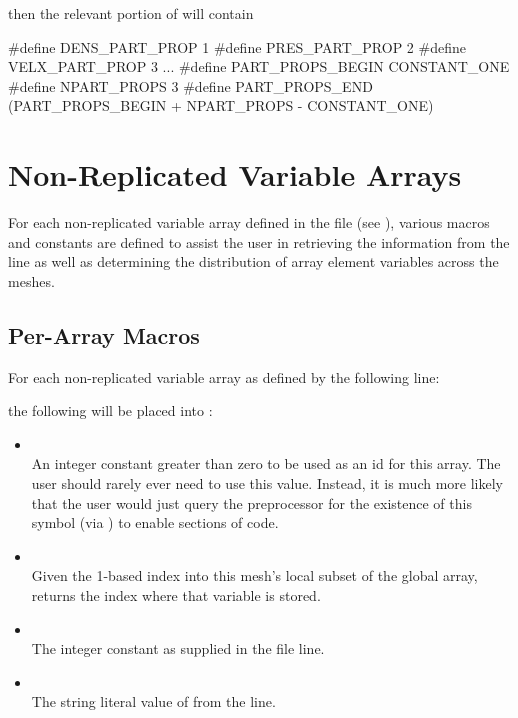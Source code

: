 then the relevant portion of  will contain
\begin{codeseg}
#define DENS_PART_PROP 1
#define PRES_PART_PROP 2
#define VELX_PART_PROP 3
...
#define PART_PROPS_BEGIN CONSTANT_ONE
#define NPART_PROPS 3
#define PART_PROPS_END (PART_PROPS_BEGIN + NPART_PROPS - CONSTANT_ONE)
\end{codeseg}

\section{Non-Replicated Variable Arrays}
\label{Sec:FlashHnonrep}
For each non-replicated variable array defined in the  file
(see ), various macros and constants are defined
to assist the user in retrieving the information from the  line as
well as determining the distribution of array element variables across the meshes.

\subsection{Per-Array Macros}
For each non-replicated variable array  as defined by the following
 line:


the following will be placed into :
\begin{itemize}
\item {}\\
An integer constant greater than zero to be used as an id for this array.
The user should rarely ever need to use this value.  Instead, it is much more
likely that the user would just query the preprocessor for the existence of
this symbol (via ) to enable sections of code.
\item {}\\
Given the 1-based index into this mesh's local subset of the global
array, returns the  index where that variable is stored.
\item {}\\
The integer constant  as supplied in the  file
 line.
\item {}\\
The string literal value of  from the  line.
\end{itemize}

